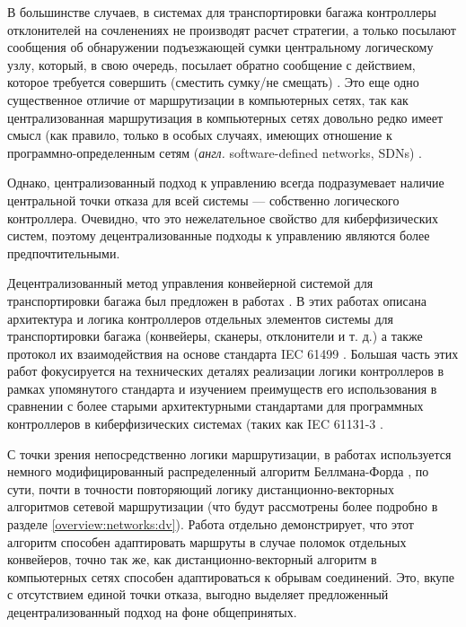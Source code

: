 \documentclass[specification,annotation,times]{itmo-student-thesis}
\theoremstyle{definition}
\begin{document}
В большинстве случаев, в системах для транспортировки багажа контроллеры
отклонителей на сочленениях не производят расчет стратегии, а только посылают
сообщения об обнаружении подъезжающей сумки центральному логическому узлу,
который, в свою очередь, посылает обратно сообщение с действием, которое
требуется совершить (сместить сумку/не смещать)
\cite{hallenborg2007decentralized, johnstone2009status}. Это еще одно
существенное отличие от маршрутизации в компьютерных сетях, так как
централизованная маршрутизация в компьютерных сетях довольно редко имеет смысл
(как правило, только в особых случаях, имеющих отношение к
программно-определенным сетям (\textit{англ.} software-defined networks, SDNs)
\cite{mao2017routing, wang2018machine}.

Однако, централизованный подход к управлению всегда подразумевает наличие
центральной точки отказа для всей системы --- собственно логического
контроллера. Очевидно, что это нежелательное свойство для киберфизических
систем, поэтому децентрализованные подходы к управлению являются более
предпочтительными.

Децентрализованный метод управления конвейерной системой для транспортировки
багажа был предложен в работах \cite{black2009intelligent, vyatkin-controllers}.
В этих работах описана архитектура и логика контроллеров отдельных элементов
системы для транспортировки багажа (конвейеры, сканеры, отклонители и т. д.) а
также протокол их взаимодействия на основе стандарта IEC 61499
\cite{IEC61499}. Большая часть этих работ фокусируется на
технических деталях реализации логики контроллеров в рамках упомянутого
стандарта и изучением преимуществ его использования в сравнении с более старыми
архитектурными стандартами для программных контроллеров в киберфизических
системах (таких как IEC 61131-3 \cite{IEC61131}.

С точки зрения непосредственно
логики маршрутизации, в работах используется немного модифицированный
распределенный алгоритм Беллмана-Форда \cite{bellman-ford}, по сути, почти в
точности повторяющий логику дистанционно-векторных алгоритмов сетевой
маршрутизации (что будут рассмотрены более подробно в разделе
\ref{overview:networks:dv}). Работа \cite{vyatkin-controllers} отдельно
демонстрирует, что этот алгоритм способен адаптировать маршруты в случае поломок
отдельных конвейеров, точно так же, как дистанционно-векторный алгоритм в
компьютерных сетях способен адаптироваться к обрывам соединений. Это, вкупе с
отсутствием единой точки отказа, выгодно выделяет предложенный
децентрализованный подход на фоне общепринятых.
\end{document}
